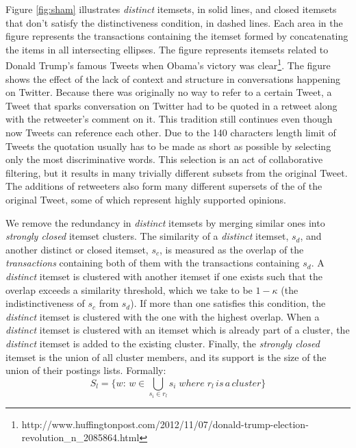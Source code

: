 \documentclass{sig-alternate}
\begin{document}
Figure \ref{fig:sham} illustrates \emph{distinct} itemsets, in solid lines, and closed itemsets that don't satisfy the distinctiveness condition, in dashed lines. Each area in the figure represents the transactions containing the itemset formed by concatenating the items in all intersecting ellipses.  
The figure represents itemsets related to Donald Trump's famous 
Tweets when Obama's victory was clear\footnote{http://www.huffingtonpost.com/2012/11/07/donald-trump-election-revolution\_n\_2085864.html}.  The figure shows the effect of the lack of context and structure in conversations happening on Twitter. Because there was originally no way to refer to a certain Tweet, a Tweet that sparks conversation on Twitter had  to be quoted in a retweet along with the retweeter's comment on it. This tradition still continues even though now Tweets can reference each other. 
Due to the 140 characters length limit of Tweets the quotation usually has to be made as short as possible by selecting only the most discriminative words. This selection is an act of collaborative filtering, but it results in many trivially different subsets from the original Tweet. The additions of retweeters also form many different supersets of the of the original Tweet, some of which represent highly supported opinions. 

We remove the redundancy in \emph{distinct} itemsets by merging similar ones into \emph{strongly closed} itemset clusters. The similarity of a \emph{distinct} itemset, $s_d$, and another distinct or closed itemset, $s_c$, is measured as the overlap of the \emph{transactions} containing both of them with the transactions containing $s_d$.  A \emph{distinct} itemset is clustered with another itemset if one exists such that the overlap exceeds a similarity threshold, which we take to be $1-\kappa$ (the indistinctiveness of $s_c$ from $s_d$).
If more than one satisfies this condition, the  \emph{distinct} itemset is clustered with the one with the highest overlap. When  a \emph{distinct} itemset is clustered with an itemset which is already part of a cluster, the \emph{distinct} itemset is added to the existing cluster. Finally, the \emph{strongly closed} itemset is the 
union of all cluster members, and its support is the size of the union of their postings lists. Formally:
\begin{equation}S_l = \{w:\, w \in \bigcup_{s_i \in r_l}{s_i} \; where \; r_l \, is \, a\, cluster\}\end{equation}
\end{document}
